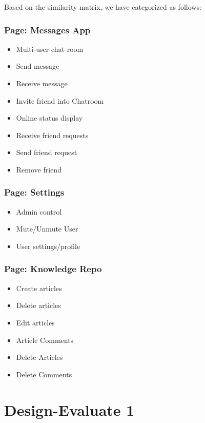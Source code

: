 \documentclass[12pt]{article}
\begin{document}
\newpage

Based on the similarity matrix, we have categorized as follows:
\begin{multicols}{2}

\subsubsection*{Page: Messages App}
\begin{itemize}
    \item Multi-user chat room
    \item Send message
    \item Receive message
    \item Invite friend into Chatroom
    \item Online status display
    \item Receive friend requests
    \item Send friend request
    \item Remove friend
\end{itemize}

\subsubsection*{Page: Settings}
\begin{itemize}
    \item Admin control
    \item Mute/Unmute User
    \item User settings/profile
\end{itemize}

\columnbreak

\subsubsection*{Page: Knowledge Repo}
\begin{itemize}
    \item Create articles
    \item Delete articles
    \item Edit articles
    \item Article Comments
    \item Delete Articles
    \item Delete Comments
\end{itemize}

\end{multicols}

\section{Design-Evaluate 1}
\end{document}
